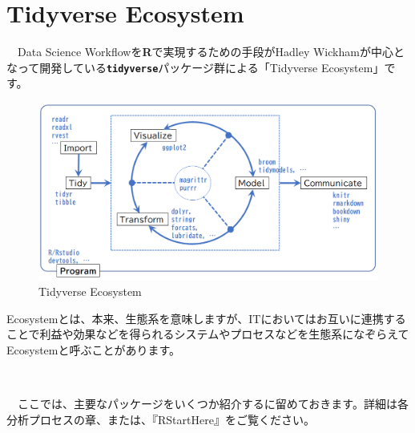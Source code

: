 \documentclass[
  12pt,
]{book}
\begin{document}
\newpage

\hypertarget{tidyverse-ecosystem}{%
\section*{Tidyverse Ecosystem}\label{tidyverse-ecosystem}}

　Data Science Workflowを\textbf{R}で実現するための手段がHadley Wickhamが中心となって開発している\textbf{\texttt{tidyverse}}パッケージ群による「Tidyverse Ecosystem」です。

\begin{figure}[H]

{\centering \includegraphics[width=0.9\linewidth,]{./fig/DSWF/tidyverse_eco_system} 

}

\caption{Tidyverse Ecosystem}\label{fig:unnamed-chunk-13}
\end{figure}

\begin{hint-box}
Ecosystemとは、本来、生態系を意味しますが、ITにおいてはお互いに連携することで利益や効果などを得られるシステムやプロセスなどを生態系になぞらえてEcosystemと呼ぶことがあります。
\end{hint-box}

　

　ここでは、主要なパッケージをいくつか紹介するに留めておきます。詳細は各分析プロセスの章、または、『RStartHere』\citep{RStartHere:GitHub}をご覧ください。
\end{document}
